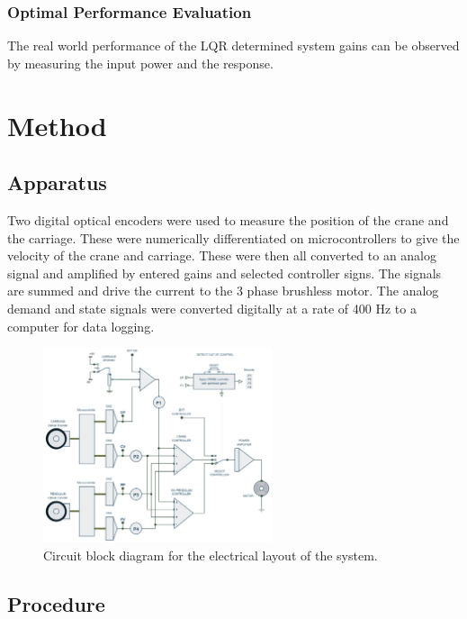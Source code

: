 \documentclass{article}
\begin{document}
\subsubsection{Optimal Performance Evaluation}

The real world performance of the LQR determined system gains can be observed by measuring the input power and the response.

\section{Method}

\subsection{Apparatus}

Two digital optical encoders were used to measure the position of the crane and the carriage.
These were numerically differentiated on microcontrollers to give the velocity of the crane and carriage.
These were then all converted to an analog signal and amplified by entered gains and selected controller signs.
The signals are summed and drive the current to the 3 phase brushless motor. 
The analog demand and state signals were converted digitally at a rate of 400 Hz to a computer for data logging. 

\begin{figure}[H]
  \centering
  \includegraphics[width=0.6\textwidth]{figures/electrical_layout.png}
  \caption{Circuit block diagram for the electrical layout of the system.}
  \label{fig:electrical_layout}
\end{figure}

\subsection{Procedure}
\end{document}
